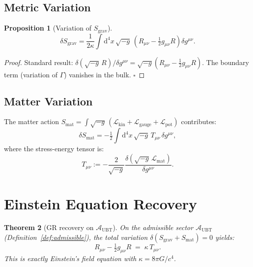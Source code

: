 \documentclass[11pt,a4paper]{article}
\newtheorem{theorem}{Theorem}[section]
\newtheorem{proposition}[theorem]{Proposition}
\theoremstyle{definition}
\theoremstyle{remark}
\begin{document}
\subsection{Metric Variation}

\begin{proposition}[Variation of $S_{\mathrm{grav}}$]
\label{prop:hilbert}
  \begin{equation}\label{eq:varSEH}
    \delta S_{\mathrm{grav}}
    = \frac{1}{2\kappa}\int \mathrm{d}^4x\,\sqrt{-g}\,
      \!\left(R_{\mu\nu} - \tfrac{1}{2}g_{\mu\nu}R\right)\delta g^{\mu\nu}.
  \end{equation}
\end{proposition}

\begin{proof}
Standard result: $\delta(\sqrt{-g}\,R)/\delta g^{\mu\nu}
= \sqrt{-g}(R_{\mu\nu} - \frac12 g_{\mu\nu}R)$.
The boundary term (variation of $\Gamma$) vanishes in the bulk.
$\square$
\end{proof}

\subsection{Matter Variation}

The matter action $S_{\mathrm{mat}} = \int\sqrt{-g}\,(\mathcal{L}_{\mathrm{kin}}
+ \mathcal{L}_{\mathrm{gauge}} + \mathcal{L}_{\mathrm{pot}})$ contributes:
\begin{equation}\label{eq:deltaSmatter}
  \delta S_{\mathrm{mat}}
  = -\tfrac{1}{2}\int \mathrm{d}^4x\,\sqrt{-g}\,T_{\mu\nu}\,\delta g^{\mu\nu},
\end{equation}
where the stress-energy tensor is:
\begin{equation}\label{eq:Tdef}
  T_{\mu\nu}
  := -\frac{2}{\sqrt{-g}}\frac{\delta(\sqrt{-g}\,\mathcal{L}_{\mathrm{mat}})}
     {\delta g^{\mu\nu}}.
\end{equation}

\section{Einstein Equation Recovery}\label{sec:einstein}

\begin{theorem}[GR recovery on $\mathcal{A}_{\mathrm{UBT}}$]
\label{thm:GR}
On the admissible sector $\mathcal{A}_{\mathrm{UBT}}$ (Definition~\ref{def:admissible}),
the total variation $\delta(S_{\mathrm{grav}} + S_{\mathrm{mat}}) = 0$ yields:
\begin{equation}\label{eq:Einstein}
  \boxed{
  R_{\mu\nu} - \tfrac{1}{2}g_{\mu\nu}R
  \;=\; \kappa\,T_{\mu\nu}.
  }
\end{equation}
This is exactly Einstein's field equation with $\kappa = 8\pi G/c^4$.
\end{theorem}
\end{document}
